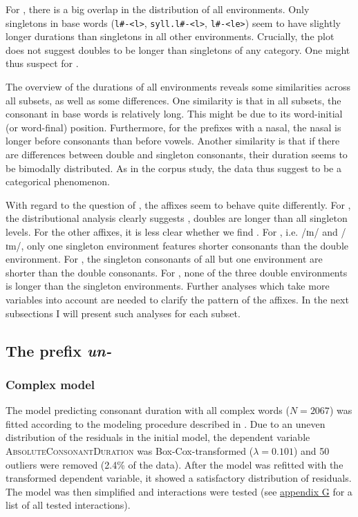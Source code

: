 
For , there is a big overlap in the distribution of all environments. Only singletons in base words (\texttt{l\#-<l>}, \texttt{syll.l\#-<l>}, \texttt{l\#-<le>}) seem to have slightly longer durations than singletons in all other environments. Crucially, the plot does not suggest doubles to be longer than singletons of any category. One might thus suspect  for . 

The overview of the durations of all environments reveals some similarities across all subsets, as well as some differences. 
One similarity is that in all subsets, the consonant in base words is relatively long. This might be due to its word-initial (or word-final) position. 
Furthermore, for the prefixes with a nasal, the nasal is longer before consonants than before vowels. 
Another similarity is that if there are differences between double and singleton consonants, their duration seems to be bimodally distributed. As in the corpus study, the data thus suggest  to be a categorical phenomenon.

With regard to the question of , the affixes seem to behave quite differently. For , the distributional analysis clearly suggests , doubles are longer than all singleton levels. 
For the other affixes, it is less clear whether we find . For , i.e. /ɪn/ and /ɪm/, only one singleton environment features shorter consonants than the double environment.
For , the singleton consonants of all but one environment are shorter than the double consonants. 
For , none of the three double environments is longer than the singleton environments. Further analyses which take more variables into account are needed to clarify the  pattern of the affixes. 
 In the next subsections I will present such analyses for each subset.


\subsection{The prefix \textit{un-}} \label{un experiment}

\subsubsection{Complex model}


The model predicting consonant duration with all complex words ($N=2067$) was fitted according to the modeling procedure described in . Due to an uneven distribution of the residuals in the initial model, the dependent variable \textsc{AbsoluteConsonantDuration} was Box-Cox-transformed ($\lambda = 0.101$) and 50 outliers were removed (2.4\% of the data).
 After the model was refitted with the transformed dependent variable, it showed a satisfactory distribution of residuals.  The model was then simplified and interactions were tested (see \hyperref[Appendix G Summaries of tested interactions in experimental study]{appendix G} for a list of all tested interactions).
 
